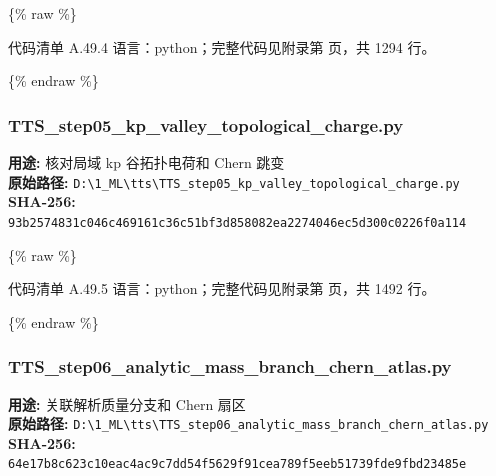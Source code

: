 \documentclass[lang=cn,scheme=chinese,color=blue,device=normal,toc=onecol,math=cm]{elegantbook}
\begin{document}
\{\% raw \%\}\par


\begin{codeindexbox}{代码清单 A.49.4}
语言：python；完整代码见附录第 \pageref{code:49:4} 页，共 1294 行。
\end{codeindexbox}


\{\% endraw \%\}\par


\subsubsection{TTS\_\allowbreak{}step05\_\allowbreak{}kp\_\allowbreak{}valley\_\allowbreak{}topological\_\allowbreak{}charge.py}


\textbf{用途:} 核对局域 kp 谷拓扑电荷和 Chern 跳变\\ \textbf{原始路径:} \texttt{D:\textbackslash{}\allowbreak{}1\_\allowbreak{}ML\textbackslash{}\allowbreak{}tts\textbackslash{}\allowbreak{}TTS\_\allowbreak{}step05\_\allowbreak{}kp\_\allowbreak{}valley\_\allowbreak{}topological\_\allowbreak{}charge.py}\\ \textbf{SHA-256:} \texttt{93b2574831c046c469161c36c51bf3d858082ea2274046ec5d300c0226f0a114}\par


\{\% raw \%\}\par


\begin{codeindexbox}{代码清单 A.49.5}
语言：python；完整代码见附录第 \pageref{code:49:5} 页，共 1492 行。
\end{codeindexbox}


\{\% endraw \%\}\par


\subsubsection{TTS\_\allowbreak{}step06\_\allowbreak{}analytic\_\allowbreak{}mass\_\allowbreak{}branch\_\allowbreak{}chern\_\allowbreak{}atlas.py}


\textbf{用途:} 关联解析质量分支和 Chern 扇区\\ \textbf{原始路径:} \texttt{D:\textbackslash{}\allowbreak{}1\_\allowbreak{}ML\textbackslash{}\allowbreak{}tts\textbackslash{}\allowbreak{}TTS\_\allowbreak{}step06\_\allowbreak{}analytic\_\allowbreak{}mass\_\allowbreak{}branch\_\allowbreak{}chern\_\allowbreak{}atlas.py}\\ \textbf{SHA-256:} \texttt{64e17b8c623c10eac4ac9c7dd54f5629f91cea789f5eeb51739fde9fbd23485e}\par
\end{document}
